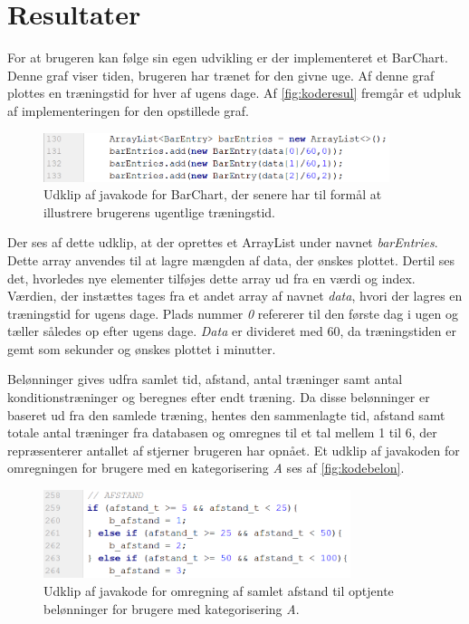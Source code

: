 \section{Resultater}
For at brugeren kan følge sin egen udvikling er der implementeret et BarChart. Denne graf viser tiden, brugeren har trænet for den givne uge. Af denne graf plottes en træningstid for hver af ugens dage. Af \autoref{fig:koderesul} fremgår et udpluk af implementeringen for den opstillede graf.

\begin{figure} [H]
\centering
\includegraphics[width=0.9\textwidth]{figures/imple/koderesul}
\caption{Udklip af javakode for BarChart, der senere har til formål at illustrere brugerens ugentlige træningstid.}
\label{fig:koderesul}
\end{figure} 

\noindent
Der ses af dette udklip, at der oprettes et ArrayList under navnet \textit{barEntries}. Dette array anvendes til at lagre mængden af data, der ønskes plottet. Dertil ses det, hvorledes nye elementer tilføjes dette array ud fra en værdi og index. Værdien, der instættes tages fra et andet array af navnet \textit{data}, hvori der lagres en træningstid for ugens dage. Plads nummer \textit{0} refererer til den første dag i ugen og tæller således op efter ugens dage. \textit{Data} er divideret med 60, da træningstiden er gemt som sekunder og ønskes plottet i minutter. 

Belønninger gives udfra samlet tid, afstand, antal træninger samt antal konditionstræninger og beregnes efter endt træning. Da disse belønninger er baseret ud fra den samlede træning, hentes den sammenlagte tid, afstand samt totale antal træninger fra databasen og omregnes til et tal mellem 1 til 6, der repræsenterer antallet af stjerner brugeren har opnået. Et udklip af javakoden for omregningen for brugere med en kategorisering \textit{A} ses af \autoref{fig:kodebelon}.

\begin{figure} [H]
\centering
\includegraphics[width=0.8\textwidth]{figures/imple/kodebelon}
\caption{Udklip af javakode for omregning af samlet afstand til optjente belønninger for brugere med kategorisering \textit{A}.}
\label{fig:kodebelon}
\end{figure} 

